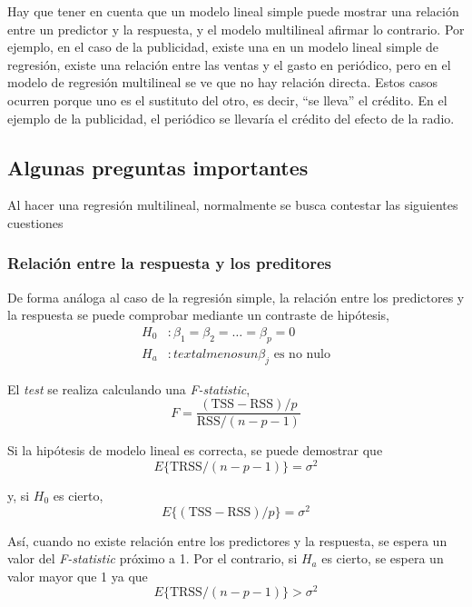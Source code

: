 Hay que tener en cuenta que un modelo lineal simple puede mostrar una relación entre un predictor y la respuesta, y el modelo multilineal afirmar lo contrario. Por ejemplo, en el caso de la publicidad, existe una en un modelo lineal simple de regresión, existe una relación entre las ventas y el gasto en periódico, pero en el modelo de regresión multilineal se ve que no hay relación directa. Estos casos ocurren porque uno es el sustituto del otro, es decir, ``se lleva'' el crédito. En el ejemplo de la publicidad, el periódico se llevaría el crédito del efecto de la radio. 

\subsection{Algunas preguntas importantes}

Al hacer una regresión multilineal, normalmente se busca contestar las siguientes cuestiones

\subsubsection{Relación entre la respuesta y los preditores}

De forma análoga al caso de la regresión simple, la relación entre los predictores y la respuesta se puede comprobar mediante un contraste de hipótesis, 
\begin{align}
H_0 &: \beta_1 = \beta_2 = \dots = \beta_p = 0 \\
H_a &: text{al menos un } \beta_j \text{ es no nulo}
\end{align}

\noindent El \textit{test} se realiza calculando una \textit{F-statistic}, 
\begin{equation}
F = \frac{(\text{TSS} - \text{RSS})/p}{\text{RSS}/(n - p - 1)}
\label{eq:3.23}
\end{equation}

\noindent Si la hipótesis de modelo lineal es correcta, se puede demostrar que 
\begin{equation}
E\{\text{TRSS}/(n - p - 1)\} = \sigma^2
\end{equation}

\noindent y, si $H_0$ es cierto, 
\begin{equation}
E\{(\text{TSS} - \text{RSS})/p\} = \sigma^2 
\end{equation}

Así, cuando no existe relación entre los predictores y la respuesta, se espera un valor del \textit{F-statistic} próximo a 1. Por el contrario, si $H_a$ es cierto, se espera un valor mayor que 1 ya que 
\begin{equation}
E\{\text{TRSS}/(n - p - 1)\} > \sigma^2
\end{equation}

